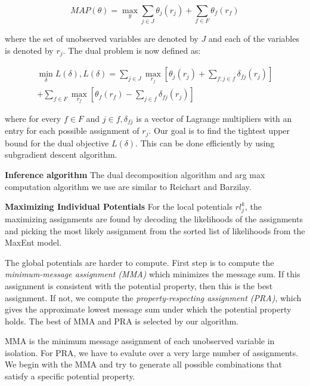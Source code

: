 \begin{equation}
MAP(\theta) = \max_{y} \sum_{j \in J} \theta_j(r_j) + \sum_{f \in F} \theta_f(r_f)
\end{equation}

where the set of unobserved variables are denoted by $J$ and each of the variables is denoted by $r_j$. The dual problem is now defined as:

\begin{multline}
\min_{\delta} L(\delta), L(\delta) = \sum_{j \in J} \max_{r_j}[\theta_j(r_j) + \sum_{f:j \in f} \delta_{fj}(r_j)]\\ +
 \sum_{f \in F} \max_{r_f}[\theta_f(r_f) - \sum_{j \in f} \delta_{fj}(r_j)]
\end{multline}

where for every $f \in F$ and $j \in f, \delta_{fj}$ is a vector of Lagrange multipliers with an entry for each possible assignment of $r_j$. Our goal is to find the tightest upper bound for the dual objective $L(\delta)$. This can be done efficiently by using subgradient descent algorithm.

{\bf Inference algorithm} The dual decomposition algorithm and arg max computation algorithm we use are similar to Reichart and Barzilay.

{\bf Maximizing Individual Potentials} For the local potentials $rl_j^k$, the maximizing assignments are found by decoding the likelihoods of the assignments and picking the most likely assignment from the sorted list of likelihoods from the MaxEnt model.

The global potentials are harder to compute. First step is to compute the {\em minimum-message assignment (MMA)} which minimizes the message sum. If this assignment is consistent with the potential property, then this is the best assignment. If not, we compute the {\em property-respecting assignment (PRA)}, which gives the approximate lowest message sum under which the potential property holds. The best of MMA and PRA is selected by our algorithm.

MMA is the minimum message assignment of each unobserved variable in isolation. For PRA, we have to evalute over a very large number of assignments. We begin with the MMA and try to generate all possible combinations that satisfy a specific potential property. 

